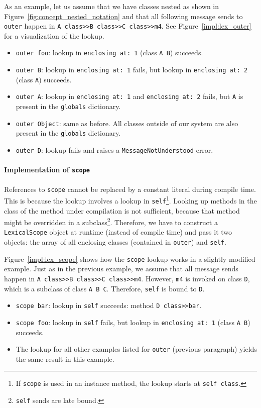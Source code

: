 As an example, let us assume that we have classes nested as shown in Figure~\ref{fig:concept_nested_notation} and that all following message sends to \texttt{outer} happen in \texttt{A class>>B class>>C class>>m4}. See Figure~\ref{impl:lex_outer} for a visualization of the lookup.
\begin{itemize}
	\item \texttt{outer foo}: lookup in \texttt{enclosing at: 1} (class \texttt{A B}) succeeds.
	\item \texttt{outer B}: lookup in \texttt{enclosing at: 1} fails, but lookup in \texttt{enclosing at: 2} (class \texttt{A}) succeeds.
	\item \texttt{outer A}: lookup in \texttt{enclosing at: 1} and \texttt{enclosing at: 2} fails, but \texttt{A} is present in the \texttt{globals} dictionary.
	\item \texttt{outer Object}: same as before. All classes outside of our system are also present in the \texttt{globals} dictionary.
	\item \texttt{outer D}: lookup fails and raises a \texttt{MessageNotUnderstood} error.
\end{itemize}

\paragraph{Implementation of \texttt{scope}}
References to \texttt{scope} cannot be replaced by a constant literal during compile time. This is because the lookup involves a lookup in \texttt{self}\footnote{If \texttt{scope} is used in an instance method, the lookup starts at \texttt{self class}.}. Looking up methods in the class of the method under compilation is not sufficient, because that method might be overridden in a subclass\footnote{\texttt{self} sends are late bound.}. Therefore, we have to construct a \texttt{LexicalScope} object at runtime (instead of compile time) and pass it two objects: the array of all enclosing classes (contained in \texttt{outer}) and \texttt{self}.

Figure~\ref{impl:lex_scope} shows how the \texttt{scope} lookup works in a slightly modified example. Just as in the previous example, we assume that all message sends happen in \texttt{A class>>B class>>C class>>m4}. However, \texttt{m4} is invoked on class \texttt{D}, which is a subclass of class \texttt{A B C}. Therefore, \texttt{self} is bound to \texttt{D}.

\begin{itemize}
	\item \texttt{scope bar}: lookup in \texttt{self} succeeds: method \texttt{D class>>bar}.
	\item \texttt{scope foo}: lookup in \texttt{self} fails, but lookup in \texttt{enclosing at: 1} (class \texttt{A B}) succeeds.
	\item The lookup for all other examples listed for \texttt{outer} (previous paragraph) yields the same result in this example.
\end{itemize}

